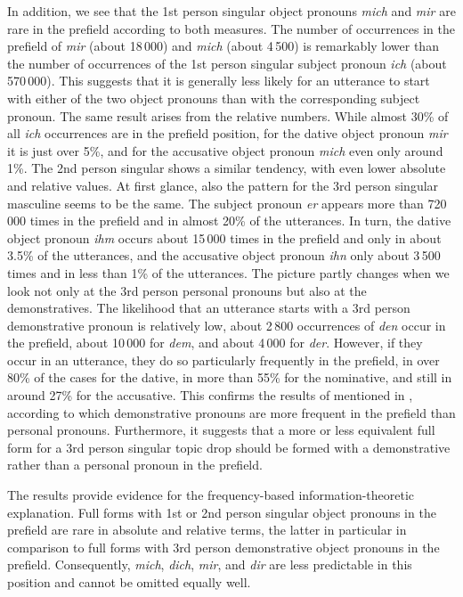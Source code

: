 In addition, we see that the 1st person singular object pronouns \textit{mich} and \textit{mir} are rare in the prefield according to both measures.
The number of occurrences in the prefield of \textit{mir} (about 18\,000) and \textit{mich} (about 4\,500) is remarkably lower than the number of occurrences of the 1st person singular subject pronoun \textit{ich} (about 570\,000).
This suggests that it is generally less likely for an utterance to start with either of the two object pronouns than with the corresponding subject pronoun.
The same result arises from the relative numbers.
While almost 30\% of all \textit{ich} occurrences are in the prefield position, for the dative  object pronoun \textit{mir} it is just over 5\%, and for the accusative  object pronoun \textit{mich} even only around 1\%.
The 2nd person singular shows a similar tendency, with even lower absolute and relative values. 
At first glance, also the pattern for the 3rd person singular masculine seems to be the same.
The subject pronoun \textit{er} appears more than 720\,000 times in the prefield and in almost 20\% of the utterances.
In turn, the dative  object pronoun \textit{ihm} occurs about 15\,000 times in the prefield and only in about 3.5\% of the utterances, and  the accusative  object pronoun \textit{ihn} only about 3\,500 times and in less than 1\% of the utterances.
The picture partly changes when we look not only at the 3rd person personal pronouns but also at the demonstratives.
The likelihood that an utterance starts with a 3rd person demonstrative pronoun is relatively low, about 2\,800 occurrences of \textit{den} occur in the prefield, about 10\,000 for \textit{dem}, and about 4\,000 for \textit{der}.
However, if they occur in an utterance, they do so particularly frequently in the prefield, in over 80\% of the cases for the dative,  in more than 55\% for the nominative,  and still in around 27\% for the accusative. 
This confirms the results of \citet{bosch.etal2007} mentioned in , according to which demonstrative pronouns are more frequent in the prefield than personal pronouns.
Furthermore, it suggests that a more or less equivalent full form for a 3rd person singular topic drop should be formed with a demonstrative rather than a personal pronoun in the prefield.

The results provide evidence for the frequency-based information-theoretic explanation.
Full forms with 1st or 2nd person singular object pronouns in the prefield are rare in absolute and relative terms, the latter in particular in comparison to full forms with 3rd person demonstrative object pronouns in the prefield.
Consequently, \textit{mich}, \textit{dich}, \textit{mir}, and \textit{dir} are less predictable in this position and cannot be omitted equally well. 

